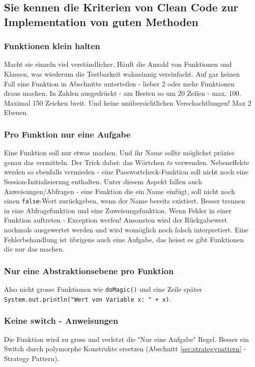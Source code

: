 \subsection{Sie kennen die Kriterien von Clean Code zur Implementation von guten Methoden}

\subsubsection{Funktionen klein halten}
Macht sie einzeln viel verständlicher. Häuft die Anzahl von Funktionen und Klassen, was wiederum die Testbarkeit wahnsinnig vereinfacht. Auf gar keinen Fall eine Funktion in Abschnitte unterteilen - lieber 2 oder mehr Funktionen draus machen.
In Zahlen ausgedrückt - am Besten so um 20 Zeilen - max. 100. Maximal 150 Zeichen breit. Und keine unübersichtlichen Verschachtlungen! Max 2 Ebenen.

\subsubsection{Pro Funktion nur eine Aufgabe}
Eine Funktion soll nur etwas machen. Und ihr Name sollte möglichst präzise genau das vermitteln. Der Trick dabei: das Wörtchen \emph{to} verwenden.
Nebeneffekte werden so ebenfalls vermieden - eine Passwortcheck-Funktion soll nicht noch eine Session-Initialisierung enthalten. 
Unter diesem Aspekt fallen auch Anweisungen/Abfragen - eine Funktion die ein Name einfügt, soll nicht noch einen \texttt{false}-Wert zurückgeben, wenn der Name bereits existiert. Besser trennen in eine Abfragefunktion und eine Zuweisungsfunktion. 
Wenn Fehler in einer Funktion auftreten - Exception werfen! Ansonsten wird der Rückgabewert nochmals ausgewertet werden und wird womöglich noch falsch interpretiert.
Eine Fehlerbehandlung ist übrigens auch eine Aufgabe, das heisst es gibt Funktionen die nur das machen.

\subsubsection{Nur eine Abstraktionsebene pro Funktion}
Also nicht grosse Funktionen wie \texttt{doMagic()} und eine Zeile später \texttt{System.out.println("Wert von Variable x: " + x)}.

\subsubsection{Keine switch - Anweisungen}
Die Funktion wird zu gross und verletzt die "Nur eine Aufgabe" Regel. Besser ein Switch durch polymorphe Konstrukte ersetzen (Abschnitt \ref{sec:strategypattern} - Strategy Pattern).

